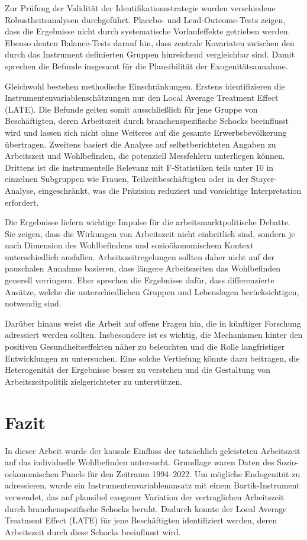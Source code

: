 \documentclass[12pt,a4paper]{article}
\begin{document}
Zur Prüfung der Validität der Identifikationsstrategie wurden verschiedene Robustheitsanalysen durchgeführt. Placebo- und Lead-Outcome-Tests zeigen, dass die Ergebnisse nicht durch systematische Vorlaufeffekte getrieben werden. Ebenso deuten Balance-Tests darauf hin, dass zentrale Kovariaten zwischen den durch das Instrument definierten Gruppen hinreichend vergleichbar sind. Damit sprechen die Befunde insgesamt für die Plausibilität der Exogenitätsannahme. 

Gleichwohl bestehen methodische Einschränkungen. Erstens identifizieren die Instrumentenvariablenschätzungen nur den Local Average Treatment Effect (LATE). Die Befunde gelten somit ausschließlich für jene Gruppe von Beschäftigten, deren Arbeitszeit durch branchenspezifische Schocks beeinflusst wird und lassen sich nicht ohne Weiteres auf die gesamte Erwerbsbevölkerung übertragen. Zweitens basiert die Analyse auf selbstberichteten Angaben zu Arbeitszeit und Wohlbefinden, die potenziell Messfehlern unterliegen können. Drittens ist die instrumentelle Relevanz mit F-Statistiken teils unter 10 in einzelnen Subgruppen wie Frauen, Teilzeitbeschäftigten oder in der Stayer-Analyse, eingeschränkt, was die Präzision reduziert und vorsichtige Interpretation erfordert.

Die Ergebnisse liefern wichtige Impulse für die arbeitsmarktpolitische Debatte. Sie zeigen, dass die Wirkungen von Arbeitszeit nicht einheitlich sind, sondern je nach Dimension des Wohlbefindens und sozioökonomischem Kontext unterschiedlich ausfallen. Arbeitszeitregelungen sollten daher nicht auf der pauschalen Annahme basieren, dass längere Arbeitszeiten das Wohlbefinden generell verringern. Eher sprechen die Ergebnisse dafür, dass differenzierte Ansätze, welche die unterschiedlichen Gruppen und Lebenslagen berücksichtigen, notwendig sind. 

Darüber hinaus weist die Arbeit auf offene Fragen hin, die in künftiger Forschung adressiert werden sollten. Insbesondere ist es wichtig, die Mechanismen hinter den positiven Gesundheitseffekten näher zu beleuchten und die Rolle langfristiger Entwicklungen zu untersuchen. Eine solche Vertiefung könnte dazu beitragen, die Heterogenität der Ergebnisse besser zu verstehen und die Gestaltung von Arbeitszeitpolitik zielgerichteter zu unterstützen.



\section{Fazit}
In dieser Arbeit wurde der kausale Einfluss der tatsächlich geleisteten Arbeitszeit auf das individuelle Wohlbefinden untersucht. Grundlage waren Daten des Sozio-oekonomischen Panels für den Zeitraum 1994--2022. Um mögliche Endogenität zu adressieren, wurde ein Instrumentenvariablenansatz mit einem Bartik-Instrument verwendet, das auf plausibel exogener Variation der vertraglichen Arbeitszeit durch branchenspezifische Schocks beruht. Dadurch konnte der Local Average Treatment Effect (LATE) für jene Beschäftigten identifiziert werden, deren Arbeitszeit durch diese Schocks beeinflusst wird.  
\end{document}
